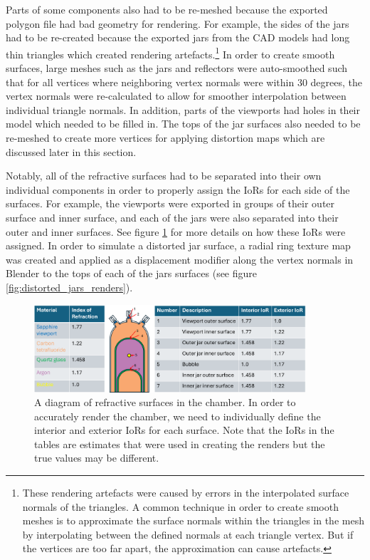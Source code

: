 \documentclass[11pt, letterpaper]{extarticle} %
\begin{document}
Parts of some components also had to be re-meshed because the exported polygon file had bad geometry for rendering. For example, the sides of the jars had to be re-created because the exported jars from the CAD models had long thin triangles which created rendering artefacts.\footnote{These rendering artefacts were caused by errors in the interpolated surface normals of the triangles. A common technique in order to create smooth meshes is to approximate the surface normals within the triangles in the mesh by interpolating between the defined normals at each triangle vertex. But if the vertices are too far apart, the approximation can cause artefacts.} In order to create smooth surfaces, large meshes such as the jars and reflectors were auto-smoothed such that for all vertices where neighboring vertex normals were within 30 degrees, the vertex normals were re-calculated to allow for smoother interpolation between individual triangle normals. In addition, parts of the viewports had holes in their model which needed to be filled in. The tops of the jar surfaces also needed to be re-meshed to create more vertices for applying distortion maps which are discussed later in this section.

Notably, all of the refractive surfaces had to be separated into their own individual components in order to properly assign the IoRs for each side of the surfaces. For example, the viewports were exported in groups of their outer surface and inner surface, and each of the jars were also separated into their outer and inner surfaces. See figure \ref{fig:chamber_materials} for more details on how these IoRs were assigned. In order to simulate a distorted jar surface, a radial ring texture map was created and applied as a displacement modifier along the vertex normals in Blender to the tops of each of the jars surfaces (see figure \ref{fig:distorted_jars_renders}). 

\begin{figure}[h]
    \centering
    \includegraphics[width=0.9\textwidth]{chamber_materials.png}
    \caption{A diagram of refractive surfaces in the chamber. In order to accurately render the chamber, we need to individually define the interior and exterior IoRs for each surface. Note that the IoRs in the tables are estimates that were used in creating the renders but the true values may be different.}
    \label{fig:chamber_materials}
\end{figure}
\end{document}
